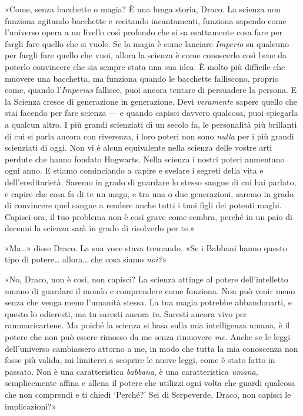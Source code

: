 «Come, senza bacchette o magia? È una lunga storia, Draco. La scienza non funziona agitando bacchette e recitando incantamenti, funziona sapendo come l’universo opera a un livello così profondo che si sa esattamente cosa fare per fargli fare quello che si vuole. Se la magia è come lanciare \textit{Imperio} su qualcuno per fargli fare quello che vuoi, allora la scienza è come conoscerlo così bene da poterlo convincere che sia sempre stata una sua idea. È molto più difficile che muovere una bacchetta, ma funziona quando le bacchette falliscono, proprio come, quando l’\textit{Imperius} fallisce, puoi ancora tentare di persuadere la persona. E la Scienza cresce di generazione in generazione. Devi \textit{veramente} sapere quello che stai facendo per fare scienza — e quando capisci davvero qualcosa, puoi spiegarla a qualcun altro. I più grandi scienziati di un secolo fa, le personalità più brillanti di cui si parla ancora con riverenza, i loro poteri non sono \textit{nulla} per i più grandi scienziati di oggi. Non vi è alcun equivalente nella scienza delle vostre arti perdute che hanno fondato Hogwarts. Nella scienza i nostri poteri aumentano ogni anno. E stiamo cominciando a capire e svelare i segreti della vita e dell’ereditarietà. Saremo in grado di guardare lo stesso sangue di cui hai parlato, e capire che cosa fa di te un mago, e tra una o due generazioni, saremo in grado di convincere quel sangue a rendere anche tutti i tuoi figli dei potenti maghi. Capisci ora, il tuo problema non è così grave come sembra, perché in un paio di decenni la scienza sarà in grado di risolverlo per te.»

«Ma…» disse Draco. La sua voce stava tremando. «Se i Babbani hanno questo tipo di potere… allora… che cosa siamo \textit{noi?}»

«No, Draco, non è così, non capisci? La scienza attinge al potere dell’intelletto umano di guardare il mondo e comprendere come funziona. Non può venir meno senza che venga meno l’umanità stessa. La tua magia potrebbe abbandonarti, e questo lo odieresti, ma tu saresti ancora \textit{tu}. Saresti ancora vivo per rammaricartene. Ma poiché la scienza si basa sulla mia intelligenza umana, è il potere che non può essere rimosso da me senza rimuovere \textit{me}. Anche se le leggi dell’universo cambiassero attorno a me, in modo che tutta la mia conoscenza non fosse più valida, mi limiterei a scoprire le nuove leggi, come è stato fatto in passato. Non è una caratteristica \textit{babbana}, è una caratteristica \textit{umana}, semplicemente affina e allena il potere che utilizzi ogni volta che guardi qualcosa che non comprendi e ti chiedi ‘Perché?’ Sei di Serpeverde, Draco, non capisci le implicazioni?»

